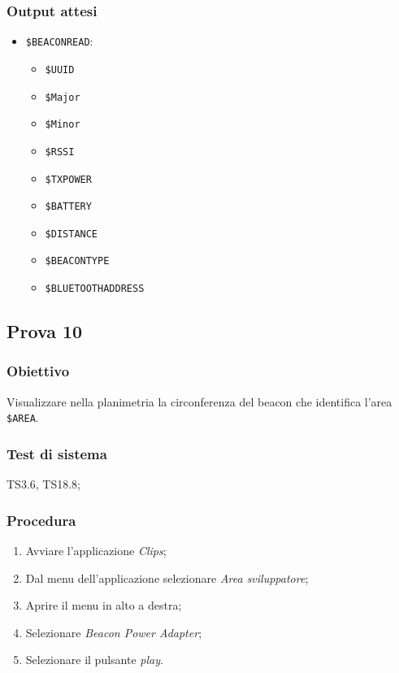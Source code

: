 \documentclass[../SperimentazioniPratiche.tex]{subfiles}
\begin{document}
	\subsubsection{Output attesi}
		\begin{itemize}
		\item \verb|$BEACONREAD|:
			\begin{itemize}
				\item \verb|$UUID|
			 	\item \verb|$Major|
			 	\item \verb|$Minor|
			 	\item \verb|$RSSI|
			 	\item \verb|$TXPOWER|
			 	\item \verb|$BATTERY|
			 	\item \verb|$DISTANCE|
			 	\item \verb|$BEACONTYPE|
			 	\item \verb|$BLUETOOTHADDRESS|
			\end{itemize}
			 
		\end{itemize}
		
\newpage
\subsection{Prova 10} %
\label{subsec:Prova10}

	\subsubsection{Obiettivo}
		Visualizzare nella planimetria la circonferenza del beacon che identifica l'area \verb|$AREA|.
	
	\subsubsection{Test di sistema}
		TS3.6, TS18.8;
	
	\subsubsection{Procedura}
		\begin{enumerate}
		\item Avviare l'applicazione \textit{Clips};
		\item Dal menu dell'applicazione selezionare \textit{Area sviluppatore};
		\item Aprire il menu in alto a destra;
		\item Selezionare \textit{Beacon Power Adapter};
		\item Selezionare il pulsante \textit{play}.
		\end{enumerate}
		
\end{document}
